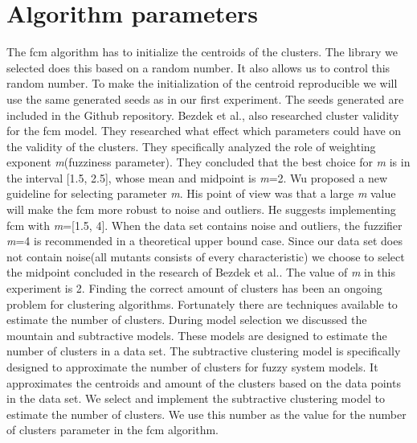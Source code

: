 \documentclass[../../main]{subfiles}
\begin{document}
\section{Algorithm parameters}
The \acrshort{fcm} algorithm has to initialize the centroids of the clusters.
The library we selected does this based on a random number.
It also allows us to control this random number.
To make the initialization of the centroid reproducible we will use the same generated seeds as in our first experiment.
The seeds generated are included in the Github repository\cite{rbasarat-repo}.
\newline
Bezdek et al., also researched cluster validity for the \acrshort{fcm} model\cite{Bezdek1995OnModel}.
They researched what effect which parameters could have on the validity of the clusters.
They specifically analyzed the role of weighting exponent \textit{m}(fuzziness parameter).
They concluded that the best choice for \textit{m} is in the interval [1.5, 2.5], whose mean and midpoint is \textit{m}=2.
Wu proposed a new guideline for selecting parameter \textit{m}\cite{Wu2012}.
His point of view was that a large \textit{m} value will make the \acrlong{fcm} more robust to noise and outliers.
He suggests implementing \acrlong{fcm} with \textit{m}=[1.5, 4].
When the data set contains noise and outliers, the fuzzifier \textit{m}=4 is recommended in a theoretical upper bound case.
Since our data set does not contain noise(all mutants consists of every characteristic) we choose to select the midpoint concluded in the research of Bezdek et al.\cite{Bezdek1995OnModel}.
The value of \textit{m} in this experiment is 2.
\newline
Finding the correct amount of clusters has been an ongoing problem for clustering algorithms\cite{Du2010Clustering:Approach}.
Fortunately there are techniques available to estimate the number of clusters.
During model selection we discussed the mountain and subtractive models. 
These models are designed to estimate the number of clusters in a data set.
The subtractive clustering model is specifically designed to approximate the number of clusters for fuzzy system models\cite{Chiu1994FuzzyEstimation}.
It approximates the centroids and amount of the clusters based on the data points in the data set\cite{Chiu1994FuzzyEstimation}.
We select and implement the subtractive clustering model to estimate the number of clusters.
We use this number as the value for the number of clusters parameter in the \acrshort{fcm} algorithm.
\end{document}
